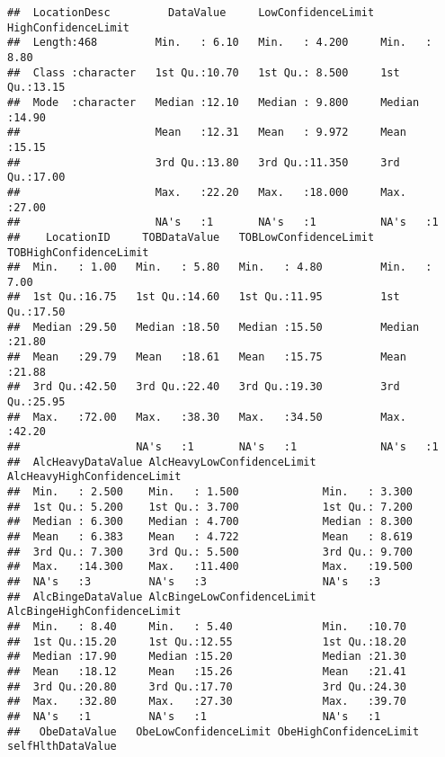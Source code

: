 \documentclass[
]{article}
\begin{document}
\begin{verbatim}
##  LocationDesc         DataValue     LowConfidenceLimit HighConfidenceLimit
##  Length:468         Min.   : 6.10   Min.   : 4.200     Min.   : 8.80      
##  Class :character   1st Qu.:10.70   1st Qu.: 8.500     1st Qu.:13.15      
##  Mode  :character   Median :12.10   Median : 9.800     Median :14.90      
##                     Mean   :12.31   Mean   : 9.972     Mean   :15.15      
##                     3rd Qu.:13.80   3rd Qu.:11.350     3rd Qu.:17.00      
##                     Max.   :22.20   Max.   :18.000     Max.   :27.00      
##                     NA's   :1       NA's   :1          NA's   :1          
##    LocationID     TOBDataValue   TOBLowConfidenceLimit TOBHighConfidenceLimit
##  Min.   : 1.00   Min.   : 5.80   Min.   : 4.80         Min.   : 7.00         
##  1st Qu.:16.75   1st Qu.:14.60   1st Qu.:11.95         1st Qu.:17.50         
##  Median :29.50   Median :18.50   Median :15.50         Median :21.80         
##  Mean   :29.79   Mean   :18.61   Mean   :15.75         Mean   :21.88         
##  3rd Qu.:42.50   3rd Qu.:22.40   3rd Qu.:19.30         3rd Qu.:25.95         
##  Max.   :72.00   Max.   :38.30   Max.   :34.50         Max.   :42.20         
##                  NA's   :1       NA's   :1             NA's   :1             
##  AlcHeavyDataValue AlcHeavyLowConfidenceLimit AlcHeavyHighConfidenceLimit
##  Min.   : 2.500    Min.   : 1.500             Min.   : 3.300             
##  1st Qu.: 5.200    1st Qu.: 3.700             1st Qu.: 7.200             
##  Median : 6.300    Median : 4.700             Median : 8.300             
##  Mean   : 6.383    Mean   : 4.722             Mean   : 8.619             
##  3rd Qu.: 7.300    3rd Qu.: 5.500             3rd Qu.: 9.700             
##  Max.   :14.300    Max.   :11.400             Max.   :19.500             
##  NA's   :3         NA's   :3                  NA's   :3                  
##  AlcBingeDataValue AlcBingeLowConfidenceLimit AlcBingeHighConfidenceLimit
##  Min.   : 8.40     Min.   : 5.40              Min.   :10.70              
##  1st Qu.:15.20     1st Qu.:12.55              1st Qu.:18.20              
##  Median :17.90     Median :15.20              Median :21.30              
##  Mean   :18.12     Mean   :15.26              Mean   :21.41              
##  3rd Qu.:20.80     3rd Qu.:17.70              3rd Qu.:24.30              
##  Max.   :32.80     Max.   :27.30              Max.   :39.70              
##  NA's   :1         NA's   :1                  NA's   :1                  
##   ObeDataValue   ObeLowConfidenceLimit ObeHighConfidenceLimit selfHlthDataValue

\end{verbatim}
\end{document}
